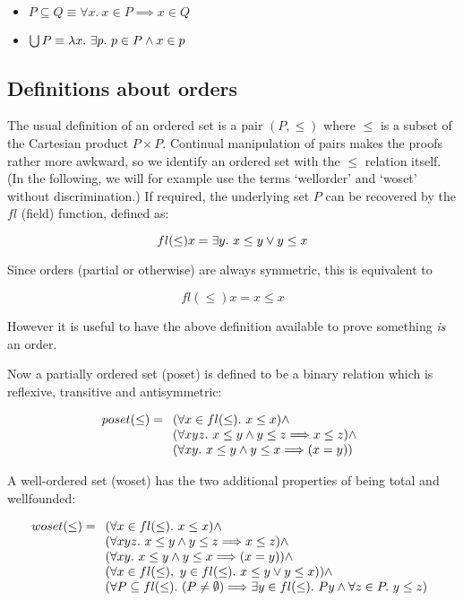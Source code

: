 \begin{itemize}

\item $ P \subseteq Q \equiv \forall x.\ x \in P \implies x \in Q $

\item $ \bigcup P \equiv \lambda x.\ \exists p.\ p \in P \wedge x \in p $

\end{itemize}

\subsection{Definitions about orders}

The usual definition of an ordered set is a pair $(P,\leq)$ where
$\leq$ is a subset of the Cartesian product $P \times P$. Continual
manipulation of pairs makes the proofs rather more awkward, so we identify an
ordered set with the $\leq$ relation itself. (In the following, we will for
example use the terms `wellorder' and `woset' without discrimination.) If
required, the underlying set $P$ can be recovered by the $fl$ (field) function,
defined as:

$$ fl(\leq) x = \exists y.\ x \leq y \vee y \leq x $$

Since orders (partial or otherwise) are always symmetric, this is equivalent to

$$ fl(\leq) x = x \leq x $$

However it is useful to have the above definition available to prove something
{\em is} an order.

Now a partially ordered set (poset) is defined to be a binary relation which is
reflexive, transitive and antisymmetric:

$$ poset(\leq) =
  \begin{array}[t]{l} (\forall x \in fl(\leq).\ x \leq x) \wedge                              \\
      (\forall x y z.\ x \leq y \wedge y \leq z \Longrightarrow x \leq z) \wedge      \\
      (\forall x y.\ x \leq y \wedge y \leq x \Longrightarrow (x = y))
  \end{array} $$

A well-ordered set (woset) has the two additional properties of being total
and wellfounded:

$$ woset(\leq) =
 \begin{array}[t]{l} (\forall x \in fl(\leq).\ x \leq x) \wedge                               \\
     (\forall x y z.\ x \leq y \wedge y \leq z \Longrightarrow x \leq z) \wedge       \\
     (\forall x y.\ x \leq y \wedge y \leq x \Longrightarrow (x = y)) \wedge          \\
     (\forall x \in fl(\leq),\ y \in fl(\leq).\
           x \leq y \vee y \leq x)) \wedge \\
     (\forall P \subseteq fl(\leq).\ (P \not= \emptyset) \Longrightarrow
       \exists y \in fl(\leq).\ P y \wedge \forall z \in P.\ y \leq z)
 \end{array} $$

